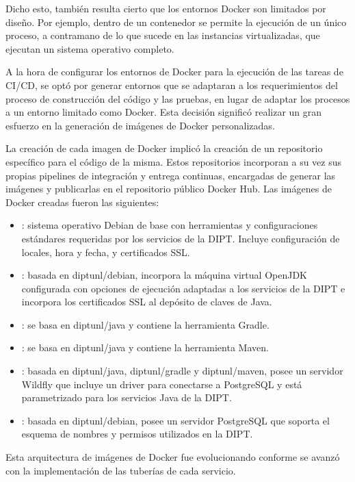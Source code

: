 Dicho esto, también resulta cierto que los entornos Docker son
limitados por diseño. Por ejemplo, dentro de un contenedor se permite
la ejecución de un único proceso, a contramano de lo que sucede en las
instancias virtualizadas, que ejecutan un sistema operativo completo.

A la hora de configurar los entornos de Docker para la ejecución de
las tareas de CI/CD, se optó por generar entornos que se adaptaran a
los requerimientos del proceso de construcción del código y las
pruebas, en lugar de adaptar los procesos a un entorno limitado como
Docker. Esta decisión significó realizar un gran esfuerzo en la
generación de imágenes de Docker personalizadas.

La creación de cada imagen de Docker implicó la creación de un
repositorio específico para el código de la misma. Estos repositorios
incorporan a su vez sus propias pipelines de integración y entrega
continuas, encargadas de generar las imágenes y publicarlas en el
repositorio público Docker Hub. Las imágenes de Docker creadas fueron
las siguientes:
%
\begin{itemize}
\item {}: sistema operativo Debian de base con
  herramientas y configuraciones estándares requeridas por los
  servicios de la DIPT. Incluye configuración de locales, hora y
  fecha, y certificados SSL.
\item {}: basada en diptunl/debian, incorpora la máquina
  virtual OpenJDK configurada con opciones de ejecución adaptadas a
  los servicios de la DIPT e incorpora los certificados SSL al
  depósito de claves de Java.
\item {}: se basa en diptunl/java y contiene la
  herramienta Gradle.
\item {}: se basa en diptunl/java y contiene la herramienta
  Maven.
\item {}: basada en diptunl/java, diptunl/gradle y
  diptunl/maven, posee un servidor Wildfly que incluye un driver para
  conectarse a PostgreSQL y está parametrizado para los servicios Java
  de la DIPT.
\item {}: basada en diptunl/debian, posee un servidor
  PostgreSQL que soporta el esquema de nombres y permisos utilizados
  en la DIPT.
\end{itemize}
%
Esta arquitectura de imágenes de Docker fue evolucionando conforme se
avanzó con la implementación de las tuberías de cada servicio.
%
